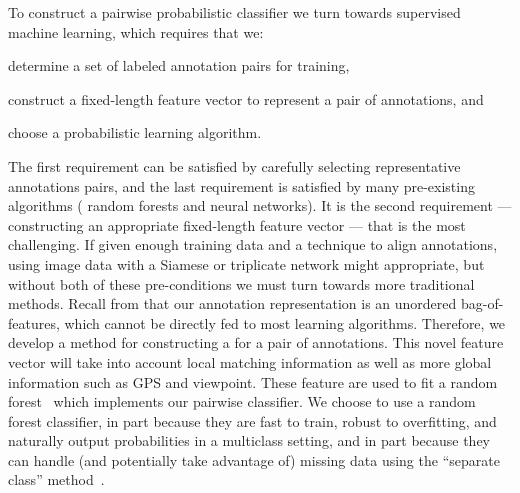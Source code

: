 \MatchStateExample{}

To construct a pairwise probabilistic classifier we turn towards supervised
  machine learning, which requires that we:
\begin{enumerate*}[label={(\arabic*)}]

    \item determine a set of labeled annotation pairs for training, 

    \item construct a fixed-length feature vector to represent a pair of
        annotations,  and 

    \item choose a probabilistic learning algorithm.
\end{enumerate*}
The first requirement can be satisfied by carefully selecting representative
  annotations pairs, and the last requirement is satisfied by many pre-existing
  algorithms (\eg{} random forests and neural networks).
It is the second requirement --- constructing an appropriate fixed-length
  feature vector --- that is the most challenging.
If given enough training data and a technique to align annotations, using
  image data with a Siamese or triplicate network might appropriate, but without
  both of these pre-conditions we must turn towards more traditional methods.
Recall from  that our annotation representation is an
  unordered bag-of-features, which cannot be directly fed to most learning
  algorithms.
Therefore, we develop a method for constructing a  for a pair of annotations.
This novel feature vector will take into account local matching information as
  well as more global information such as GPS and viewpoint.
These feature are used to fit a random forest~\cite{breiman_random_2001} which
  implements our pairwise classifier.
We choose to use a random forest classifier, in part because they are fast to
  train, robust to overfitting, and naturally output probabilities in a
  multiclass setting, and in part because they can handle (and potentially take
  advantage of) missing data using the ``separate class''
  method~\cite{ding_investigation_2010}.
  

